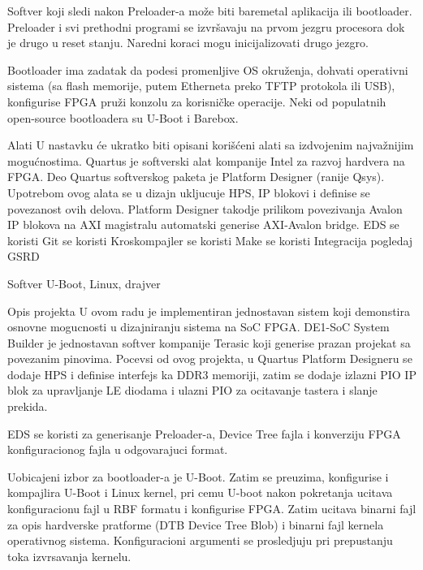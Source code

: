 Softver koji sledi nakon Preloader-a može biti baremetal aplikacija ili bootloader. Preloader i svi prethodni programi se izvršavaju na prvom jezgru procesora dok je drugo u reset stanju. Naredni koraci mogu inicijalizovati drugo jezgro.

Bootloader ima zadatak da podesi promenljive OS okruženja, dohvati operativni sistema (sa flash memorije, putem Etherneta preko TFTP protokola ili USB), konfigurise FPGA pruži konzolu za korisničke operacije. Neki od populatnih open-source bootloadera su U-Boot i Barebox.

Alati
U nastavku će ukratko biti opisani korišćeni alati sa izdvojenim najvažnijim mogućnostima.
Quartus je softverski alat kompanije Intel za razvoj hardvera na FPGA. Deo Quartus softverskog paketa je Platform Designer (ranije Qsys). Upotrebom ovog alata se u dizajn ukljucuje HPS, IP blokovi i definise se povezanost ovih delova. Platform Designer takodje prilikom povezivanja Avalon IP blokova na AXI magistralu automatski generise AXI-Avalon bridge.
EDS se koristi
Git se koristi
Kroskompajler se koristi
Make se koristi
Integracija pogledaj GSRD

Softver
U-Boot, Linux, drajver

Opis projekta
U ovom radu je implementiran jednostavan sistem koji demonstira osnovne mogucnosti u dizajniranju sistema na SoC FPGA. 
DE1-SoC System Builder je jednostavan softver kompanije Terasic koji generise prazan projekat sa povezanim pinovima. Pocevsi od ovog projekta, u Quartus Platform Designeru se dodaje HPS i definise interfejs ka DDR3 memoriji, zatim se dodaje izlazni PIO IP blok za upravljanje LE diodama i ulazni PIO za ocitavanje tastera i slanje prekida.

EDS se koristi za generisanje Preloader-a, Device Tree fajla i konverziju FPGA konfiguracionog fajla u odgovarajuci format. 

Uobicajeni izbor za bootloader-a je U-Boot. Zatim se preuzima, konfigurise i kompajlira U-Boot i Linux kernel, pri cemu U-boot nakon pokretanja ucitava konfiguracionu fajl u RBF formatu i konfigurise FPGA. Zatim ucitava binarni fajl za opis hardverske pratforme (DTB Device Tree Blob) i binarni fajl kernela operativnog sistema. Konfiguracioni argumenti se prosledjuju pri prepustanju toka izvrsavanja kernelu.


